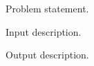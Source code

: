 \documentclass[pl]{sim-statement} %
\date{}
\begin{document}
\begin{statement}

Problem statement.

\sectionInput
Input description.

\sectionOutput
Output description.

\begin{samples} %
\end{samples}

\begin{grading}
\end{grading}

\end{statement}
\end{document}
